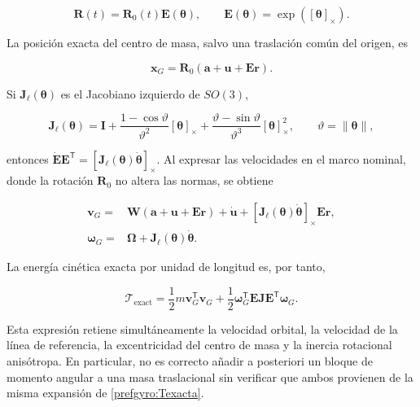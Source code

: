 \begin{equation}
 \bm R(t)=\bm R_0(t)\bm E(\bm\theta),
 \qquad
 \bm E(\bm\theta)=\exp([\bm\theta]_\times).
 \label{prefgyro:Rexacta}
\end{equation}

La posición exacta del centro de masa, salvo una traslación común del origen,
es

\begin{equation}
 \bm x_G=\bm R_0
 \left(\bm a+\bm u+\bm E\bm r\right).
 \label{prefgyro:xG}
\end{equation}

Si $\bm J_\ell(\bm\theta)$ es el Jacobiano izquierdo de $SO(3)$,

\begin{equation}
 \bm J_\ell(\bm\theta)
 =\bm I+\frac{1-\cos\vartheta}{\vartheta^2}[\bm\theta]_\times
 +\frac{\vartheta-\sin\vartheta}{\vartheta^3}
 [\bm\theta]_\times^2,
 \qquad \vartheta=\lVert\bm\theta\rVert,
 \label{prefgyro:Jleft}
\end{equation}

entonces
$\dot{\bm E}\bm E^{\mathsf T}
 =[\bm J_\ell(\bm\theta)\dot{\bm\theta}]_\times$.
Al expresar las velocidades en el marco nominal, donde la rotación
$\bm R_0$ no altera las normas, se obtiene

\begin{align}
 \bm v_G={}&
 \bm W\left(\bm a+\bm u+\bm E\bm r\right)
 +\dot{\bm u}
 +[\bm J_\ell(\bm\theta)\dot{\bm\theta}]_\times
 \bm E\bm r,
 \label{prefgyro:vexacta}\\
 \bm\omega_G={}&
 \bm\Omega+\bm J_\ell(\bm\theta)\dot{\bm\theta}.
 \label{prefgyro:omegaexacta}
\end{align}

La energía cinética exacta por unidad de longitud es, por tanto,

\begin{equation}
 \mathcal T_{\mathrm{exact}}
 =\frac12m\bm v_G^{\mathsf T}\bm v_G
 +\frac12\bm\omega_G^{\mathsf T}
 \bm E\bm J\bm E^{\mathsf T}\bm\omega_G .
 \label{prefgyro:Texacta}
\end{equation}

Esta expresión retiene simultáneamente la velocidad orbital, la velocidad de la
línea de referencia, la excentricidad del centro de masa y la inercia rotacional
anisótropa. En particular, no es correcto añadir a posteriori un bloque de
momento angular a una masa traslacional sin verificar que ambos provienen de la
misma expansión de \eqref{prefgyro:Texacta}.

